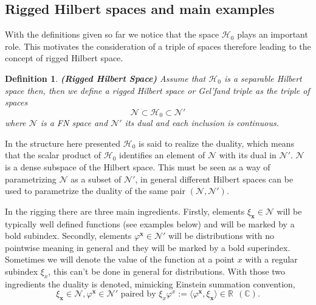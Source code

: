 \documentclass[12pt]{article}%
\newtheorem{definition}{Definition}%
\begin{document}
\subsection{Rigged Hilbert spaces and main examples}

With the definitions given so far we notice that the space $\mathcal{H}_0$ plays an important role. This motivates the consideration of a triple of spaces therefore leading to the concept of rigged Hilbert space. 

\begin{definition} {\bf (Rigged Hilbert Space)}
    \label{def:RHS}
    Assume that $\mathcal{H}_0$ is a separable Hilbert space then, then we define a rigged Hilbert space or Gel'fand triple as the triple of spaces
\begin{equation*}
\label{eq:rigged}
\mathcal{N}\subset \mathcal{H}_0 \subset \mathcal{N}'
\end{equation*}
where $\mathcal{N}$ is a FN space and $\mathcal{N}'$ its dual and each inclusion is continuous. 

\end{definition}

In the structure here presented $\mathcal{H}_0$ is said to realize the duality, which means that the scalar product of $\mathcal{H}_0$ identifies an element of $\mathcal{N}$ with its dual in $\mathcal{N}'$. 
$\mathcal{N}$ is a dense subspace of the Hilbert space.
This must be seen as a way of parametrizing  $\mathcal{N}$ as a subset of $\mathcal{N}'$, in general different Hilbert spaces can be used to parametrize the duality of the same pair $(\mathcal{N},\mathcal{N}')$.



In the rigging there are three main ingredients. Firstly,  elements  $\xi_{\mathbf{x}}\in\mathcal{N}$ will be typically well defined functions (see examples below) and will be marked by a bold subindex.  Secondly,  elements $\varphi^{\mathbf{x}}\in\mathcal{N}'$ will be distributions with no pointwise meaning in general and they will be marked by a bold superindex. Sometimes we will denote the value of the function at a point $x$  with  a regular subindex $\xi_x$, this can't be done in general for distributions. With those two ingredients the duality is denoted, mimicking Einstein summation convention, 
\begin{equation}
\label{eq:dualityNotationDistributions}
\xi_{\mathbf{x}}\in\mathcal{N}, \varphi^{\mathbf{x}}\in\mathcal{N}' \textrm{ paired by } \xi_x\varphi^x :=\langle\varphi^{\mathbf{x}},\xi_{\mathbf{x}}\rangle \in \mathbb{R}\ \ (\mathbb{C}).
\end{equation}
\end{document}
